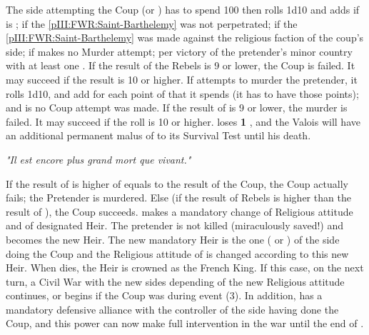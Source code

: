 \begin{digressions}
  \phpaix
  \aparag The side attempting the Coup (\LIG or \HUG) has to spend 100\ducats
  then rolls 1d10 and adds  if \FRA is \CATHCO;  if the
  \ref{pIII:FWR:Saint-Barthelemy} was not perpetrated;  if the
  \ref{pIII:FWR:Saint-Barthelemy} was made against the religious faction of
  the coup's side;  if \FRA makes no Murder attempt;  per
  victory of the pretender's minor country with at least one \ARMY \faceplus.
   If the result of the Rebels is 9 or lower, the
  Coup is failed. It may succeed if the result is 10 or higher.
  \aparag If \FRA attempts to murder the pretender, it rolls 1d10, and add
   for each point of \STAB that it spends (it has to have those
  points); and  is no Coup attempt was made.
   If the result of \FRA is 9 or lower, the
  murder is failed. It may succeed if the roll is 10 or higher.  \FRA loses
  {\bf 1} \STAB, and the Valois  will have
  an additional permanent malus of  to its Survival Test until his death. \\
  \centerline{\textit{"Il est encore plus grand mort que vivant."}}
  \bparag If the result of \FRA is higher of equals to the result of the Coup,
  the Coup actually fails; the Pretender is murdered.
  \bparag Else (if the result of Rebels is higher than the result of \FRA),
  the Coup succeeds. \FRA makes a mandatory change of Religious attitude and
  of designated Heir. The pretender is not killed (miraculously saved!) and
  becomes the new Heir.
  \bparag The new mandatory Heir is the one ( or
  ) of the side doing the Coup and the Religious
  attitude of \FRA is changed according to this new Heir.
  \bparag When  dies, the Heir is crowned as the French
  King.
  \bparag If this case, on the next turn, a Civil War with the new sides
  depending of the new Religious attitude continues, or begins if the Coup was
  during event (3).
  \aparag In addition, \FRA has a mandatory defensive alliance with the
  controller of the side having done the Coup, and this power can now make
  full intervention in the war until the end of .




\end{digressions}
